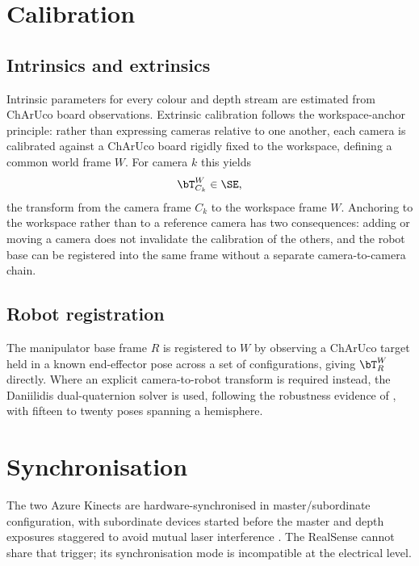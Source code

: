 \section{Calibration}
\label{sec:calib}

\subsection{Intrinsics and extrinsics}

Intrinsic parameters for every colour and depth stream are estimated from
ChArUco board observations. Extrinsic calibration follows the workspace-anchor
principle: rather than expressing cameras relative to one another, each camera
is calibrated against a ChArUco board rigidly fixed to the workspace, defining
a common world frame $W$. For camera $k$ this yields
\begin{equation}
  \bT^{W}_{C_k} \in \SE,
  \label{eq:extrinsic}
\end{equation}
the transform from the camera frame $C_k$ to the workspace frame $W$. Anchoring
to the workspace rather than to a reference camera has two consequences: adding
or moving a camera does not invalidate the calibration of the others, and the
robot base can be registered into the same frame without a separate
camera-to-camera chain.

\subsection{Robot registration}

The manipulator base frame $R$ is registered to $W$ by observing a ChArUco
target held in a known end-effector pose across a set of configurations, giving
$\bT^{W}_{R}$ directly. Where an explicit camera-to-robot transform is required
instead, the Daniilidis dual-quaternion solver is used, following the
robustness evidence of \cite{alihandeye}, with fifteen to twenty poses spanning
a hemisphere.

\section{Synchronisation}
\label{sec:sync}

The two Azure Kinects are hardware-synchronised in master/subordinate
configuration, with subordinate devices started before the master and depth
exposures staggered to avoid mutual laser interference \cite{mskinect}. The
RealSense cannot share that trigger; its synchronisation mode is incompatible
at the electrical level.

